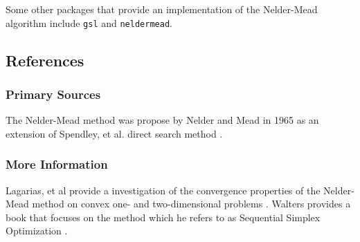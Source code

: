 Some other packages that provide an implementation of the Nelder-Mead algorithm include \texttt{gsl} and \texttt{neldermead}.

\subsection{References}

\subsubsection{Primary Sources}
The Nelder-Mead method was propose by Nelder and Mead in 1965 \cite{Nelder1965} as an extension of Spendley, et al. direct search method \cite{Spendley1962}.

\subsubsection{More Information}
Lagarias, et al provide a investigation of the convergence properties of the Nelder-Mead method on convex one- and two-dimensional problems \cite{Lagarias1998}.
Walters provides a book that focuses on the method which he refers to as Sequential Simplex Optimization \cite{Walters1991}.

